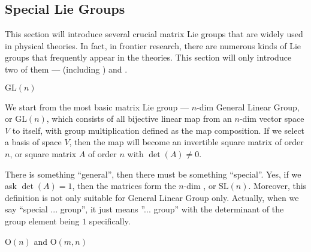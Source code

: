 \documentclass[letterpaper,10pt,english]{sphinxmanual}
\begin{document}
\subsection{Special Lie Groups}
\label{\detokenize{bg_liegp:special-lie-groups}}
This section will introduce several crucial matrix Lie groups that are widely used in physical theories. In fact, in frontier research, there are numerous kinds of Lie groups that frequently appear in the theories. This section will only introduce two of them ---  (including ) and .

 \(\mathrm{GL}(n)\)

We start from the most basic matrix Lie group --- \(n\)-dim General Linear Group, or \(\mathrm{GL}(n)\), which consists of all bijective linear map from an \(n\)-dim vector space \(V\) to itself, with group multiplication defined as the map composition. If we select a basis of space \(V\), then the map will become an invertible square matrix of order \(n\), or square matrix \(A\) of order \(n\) with \(\det(A)\neq0\).

There is something ``general'', then there must be something ``special''. Yes, if we ask \(\det(A)=1\), then the matrices form the \(n\)-dim , or \(\mathrm{SL}(n)\). Moreover, this definition is not only suitable for General Linear Group only. Actually, when we say ``special ... group'', it just means ''... group'' with the determinant of the group element being \(1\) specifically.

 \(\mathrm{O}(n)\) and \(\mathrm{O}(m,n)\)
\end{document}
